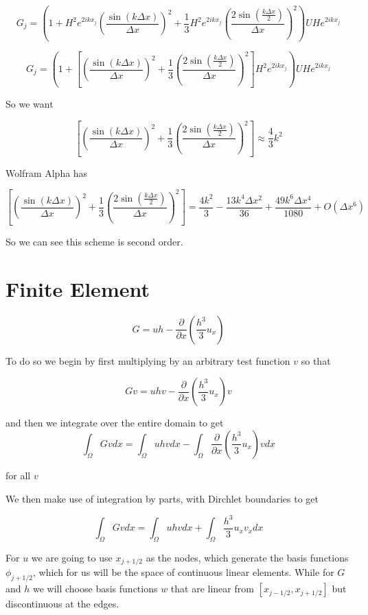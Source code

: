 \documentclass[12pt]{article}
\begin{document}
\[G_j = \left(1 + H^2 e^{2ikx_j} \left(\frac{\sin\left(k\Delta x\right)}{\Delta x}\right)^2  + \frac{1}{3} H^2 e^{2ikx_j} \left(\frac{2\sin\left(\frac{k\Delta x}{2}\right)}{\Delta x}\right)^2 \right)UH e^{2ikx_j}\]

\[G_j = \left(1 + \left[\left(\frac{\sin\left(k\Delta x\right)}{\Delta x}\right)^2  + \frac{1}{3} \left(\frac{2\sin\left(\frac{k\Delta x}{2}\right)}{\Delta x}\right)^2\right]H^2 e^{2ikx_j} \right)UH e^{2ikx_j}\]

So we want

\[\left[\left(\frac{\sin\left(k\Delta x\right)}{\Delta x}\right)^2  + \frac{1}{3} \left(\frac{2\sin\left(\frac{k\Delta x}{2}\right)}{\Delta x}\right)^2\right] \approx \frac{4}{3}k^2 \] 

Wolfram Alpha has

\[\left[\left(\frac{\sin\left(k\Delta x\right)}{\Delta x}\right)^2  + \frac{1}{3} \left(\frac{2\sin\left(\frac{k\Delta x}{2}\right)}{\Delta x}\right)^2\right] = \frac{4k^2}{3} - \frac{13 k^4 \Delta x^2}{36} + \frac{49 k^6 \Delta x^4}{1080} + O(\Delta x^6)\]

So we can see this scheme is second order.

\section{Finite Element}

\[G = uh - \frac{\partial}{\partial x}\left(\frac{h^3}{3}u_x\right)\]

To do so we begin by first multiplying by an arbitrary test function $v$ so that

\[Gv = uhv  - \frac{\partial}{\partial x}\left(\frac{h^3}{3}u_x\right)v\]

and then we integrate over the entire domain to get 
\[\int_\Omega Gv dx = \int_\Omega uhv dx - \int_\Omega \frac{\partial}{\partial x}\left(\frac{h^3}{3}u_x\right)vdx\]

for all $v$

We then make use of integration by parts, with Dirchlet boundaries to get

\[\int_\Omega Gv dx = \int_\Omega uhv dx + \int_\Omega\frac{h^3}{3}u_{x}v_xdx\]

For $u$ we are going to use $x_{j + 1/2}$ as the nodes, which generate the basis functions $\phi_{j + 1/2}$, which for us will be the space of continuous linear elements. While for $G$  and $h$ we will choose basis functions $w$ that are linear from $[x_{j-1/2}, x_{j+1/2}]$ but discontinuous at the edges.
\end{document}
